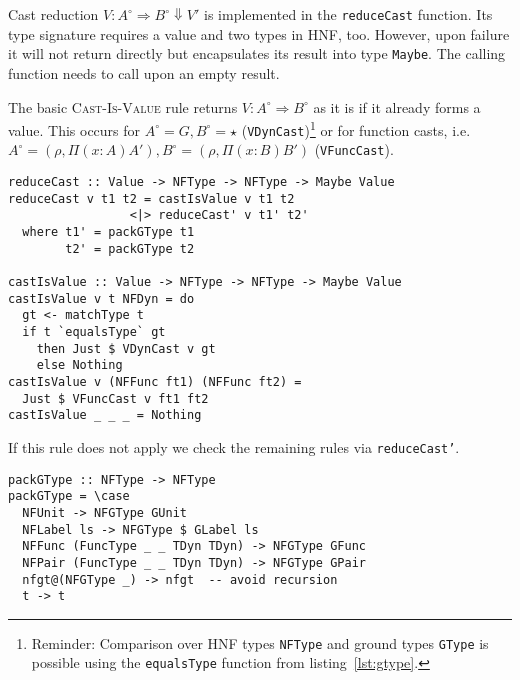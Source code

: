 Cast reduction $V : A^\circ \Rightarrow B^\circ \Downarrow V'$ is implemented in the \texttt{reduceCast} function. Its type signature requires a value and two types in HNF, too. However, upon failure it will not return \blame directly but encapsulates its result into type \texttt{Maybe}. The calling function needs to call \blame upon an empty result.

The basic \textsc{Cast-Is-Value} rule returns $V : A^\circ \Rightarrow B^\circ$ as it is if it already forms a value. This occurs for $A^\circ = G, B^\circ = \star$ (\texttt{VDynCast})\footnote{Reminder: Comparison over HNF types \texttt{NFType} and ground types \texttt{GType} is possible using the \texttt{equalsType} function from listing~\ref{lst:gtype}.} or for function casts, i.e. $A^\circ=(\rho, \Pi(x:A)A'), B^\circ=(\rho, \Pi(x:B)B')$ (\texttt{VFuncCast}).

\begin{lstlisting}[caption=Interpreter.hs]
reduceCast :: Value -> NFType -> NFType -> Maybe Value
reduceCast v t1 t2 = castIsValue v t1 t2
                 <|> reduceCast' v t1' t2'
  where t1' = packGType t1
        t2' = packGType t2

castIsValue :: Value -> NFType -> NFType -> Maybe Value
castIsValue v t NFDyn = do
  gt <- matchType t
  if t `equalsType` gt
    then Just $ VDynCast v gt
    else Nothing
castIsValue v (NFFunc ft1) (NFFunc ft2) =
  Just $ VFuncCast v ft1 ft2
castIsValue _ _ _ = Nothing
\end{lstlisting}

If this rule does not apply we check the remaining rules via \texttt{reduceCast'}.

\begin{lstlisting}[caption=Interpreter.hs]
packGType :: NFType -> NFType
packGType = \case
  NFUnit -> NFGType GUnit
  NFLabel ls -> NFGType $ GLabel ls
  NFFunc (FuncType _ _ TDyn TDyn) -> NFGType GFunc
  NFPair (FuncType _ _ TDyn TDyn) -> NFGType GPair
  nfgt@(NFGType _) -> nfgt  -- avoid recursion
  t -> t
\end{lstlisting}
